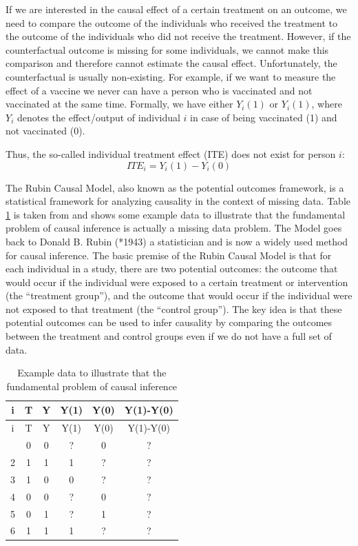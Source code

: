 \documentclass[
  12pt,
  oneside]{book}
\theoremstyle{definition}
\theoremstyle{definition}
\theoremstyle{definition}
\theoremstyle{definition}
\theoremstyle{remark}
\begin{document}
If we are interested in the causal effect of a certain treatment on an outcome, we need to compare the outcome of the individuals who received the treatment to the outcome of the individuals who did not receive the treatment. However, if the counterfactual outcome is missing for some individuals, we cannot make this comparison and therefore cannot estimate the causal effect. Unfortunately, the counterfactual is usually non-existing.
For example, if we want to measure the effect of a vaccine we never can have a person who is vaccinated and not vaccinated at the same time. Formally, we have either \(Y_i(1)\) or \(Y_i(1)\), where \(Y_i\) denotes the effect/output of individual \(i\) in case of being vaccinated (1) and not vaccinated (0).

Thus, the so-called individual treatment effect (ITE) does not exist for person \(i\):
\[
ITE_i=Y_i(1)-Y_i(0)
\]

The Rubin Causal Model, also known as the potential outcomes framework, is a statistical framework for analyzing causality in the context of missing data.
Table \ref{tab:tab21} is taken from \citet{Neal2020Introduction} and shows some example data to illustrate that the fundamental problem of causal inference is actually a missing data problem.
The Model goes back to Donald B. Rubin (*1943) a statistician and is now a widely used method for causal inference. The basic premise of the Rubin Causal Model is that for each individual in a study, there are two potential outcomes: the outcome that would occur if the individual were exposed to a certain treatment or intervention (the ``treatment group''), and the outcome that would occur if the individual were not exposed to that treatment (the ``control group''). The key idea is that these potential outcomes can be used to infer causality by comparing the outcomes between the treatment and control groups even if we do not have a full set of data.

\begin{longtable}[]{@{}cccccc@{}}
\caption{\label{tab:tab21} Example data to illustrate that the fundamental problem of causal inference}\tabularnewline
\toprule\noalign{}
i & T & Y & Y(1) & Y(0) & Y(1)-Y(0) \\
\midrule\noalign{}
\endfirsthead
\toprule\noalign{}
i & T & Y & Y(1) & Y(0) & Y(1)-Y(0) \\
\midrule\noalign{}
\endhead
\bottomrule\noalign{}
\endlastfoot
1 & 0 & 0 & ? & 0 & ? \\
2 & 1 & 1 & 1 & ? & ? \\
3 & 1 & 0 & 0 & ? & ? \\
4 & 0 & 0 & ? & 0 & ? \\
5 & 0 & 1 & ? & 1 & ? \\
6 & 1 & 1 & 1 & ? & ? \\
\end{longtable}
\end{document}
